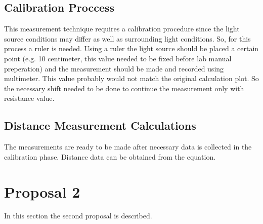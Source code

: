 \documentclass[letterpaper,12pt]{article}
\begin{document}
\subsection{Calibration Proccess}
This measurement technique requires a calibration procedure since the light source conditions may differ as well as surrounding light conditions. So, for this process a ruler is needed. Using a ruler the light source should be placed a certain point (e.g. 10 centimeter, this value needed to be fixed before lab manual preperation) and the measurement should be made and recorded using multimeter. This value probably would not match the original calculation plot. So the necessary shift needed to be done to continue the measurement only with resistance value.
\subsection{Distance Measurement Calculations}
The measurements are ready to be made after necessary data is collected in the calibration phase. Distance data can be obtained from the  equation.



\section{Proposal 2}
In this section the second proposal is described.
\end{document}
